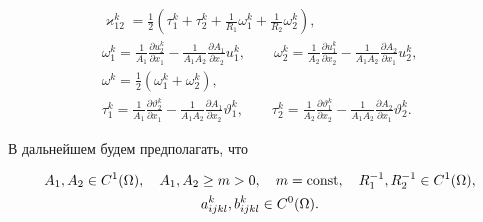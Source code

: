 \begin{gather*}
%


\varkappa _{12}^k = \frac{1}{2}(\tau_{1}^k+\tau_{2}^k+


\frac{1}{R_{1}}\omega_{1}^k+


\frac{1}{R_{2}}\omega_{2}^k),\\


%


\omega_{1}^k = \frac{1}{A_{1}} \frac{\partial u_{2}^k}{\partial x_{1}}


- \frac{1}{A_{1} A_{2}} \frac{ \partial A_{1}}{ \partial x_{2}} u_{1}^k,


\qquad


\omega_{2}^k = \frac{1}{A_{2}} \frac{\partial u_{1}^k}{\partial x_{2}}


- \frac{1}{A_{1} A_{2}} \frac{\partial A_{2}}{\partial x_{1}} u_{2}^k ,\\


%


\omega^k = \frac{1}{2} \left (\omega_1^k + \omega_2^k \right ),\\


%


\tau_{1}^k = \frac{1}{A_{1}} \frac{\partial \vartheta_{2}^k}{\partial


x_{1}} - \frac{1}{A_{1}A_{2}} \frac{\partial A_{1}}


{\partial x_{2}} \vartheta_{1}^k, \qquad


\tau_{2}^k = \frac{1}{A_{2}} \frac{\partial \vartheta_{1}^k}{\partial


x_{2}} - \frac{1}{A_{1}A_{2}} \frac{\partial A_{2}}


{\partial x_{1}} \vartheta_{2}^k.


\end{gather*}





В дальнейшем будем предполагать, что


\begin{gather}\label{glad1}


A_{1}, A_{2}\in C^{1}(\Omega ),\quad A_{1}, A_{2}\ge m >0,\quad


m=\const, \quad


R^{-1}_{1}, R^{-1}_{2}\in C^{1}(\Omega ),\\


\label{glad2}


a^{k}_{ijkl}, b^{k}_{ijkl} \in C^{0}(\Omega ).


\end{gather}


